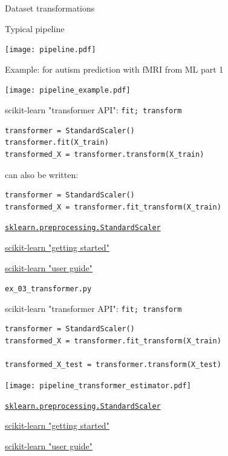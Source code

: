 \documentclass[presentation,mathserif,table]{beamer}
\begin{document}
\begin{frame}[label={sec:org1d89a0c}]{Dataset transformations}
\begin{block}{Typical pipeline}
\begin{center}
\texttt{[image: pipeline.pdf]}
\end{center}
\end{block}

\begin{block}{Example: for autism prediction with fMRI from ML part 1}
\begin{center}
\texttt{[image: pipeline\_example.pdf]}
\end{center}
\end{block}
\end{frame}
\begin{frame}[label={sec:org9d96564},fragile]{scikit-learn "transformer API": \texttt{fit; transform}}
 \begin{verbatim}
transformer = StandardScaler()
transformer.fit(X_train)
transformed_X = transformer.transform(X_train)
\end{verbatim}
\begin{block}{can also be written:}
\begin{verbatim}
transformer = StandardScaler()
transformed_X = transformer.fit_transform(X_train)
\end{verbatim}
\end{block}
\begin{structureenv} %
\vfill
\href{https://scikit-learn.org/stable/modules/generated/sklearn.preprocessing.StandardScaler.html\#sklearn.preprocessing.StandardScaler}{\texttt{sklearn.preprocessing.StandardScaler}}

\href{https://scikit-learn.org/stable/getting\_started.html\#transformers-and-pre-processors}{scikit-learn "getting started"}

\href{https://scikit-learn.org/stable/data\_transforms.html}{scikit-learn "user guide"}

\vfill
\texttt{ex\_03\_transformer.py}
\end{structureenv}
\end{frame}
\begin{frame}[label={sec:org821786f},fragile]{scikit-learn "transformer API": \texttt{fit; transform}}
 \begin{verbatim}
transformer = StandardScaler()
transformed_X = transformer.fit_transform(X_train)

transformed_X_test = transformer.transform(X_test)
\end{verbatim}
\vfill
\begin{center}
\texttt{[image: pipeline\_transformer\_estimator.pdf]}
\end{center}

\href{https://scikit-learn.org/stable/modules/generated/sklearn.preprocessing.StandardScaler.html\#sklearn.preprocessing.StandardScaler}{\texttt{sklearn.preprocessing.StandardScaler}}

\href{https://scikit-learn.org/stable/getting\_started.html\#transformers-and-pre-processors}{scikit-learn "getting started"}

\href{https://scikit-learn.org/stable/data\_transforms.html}{scikit-learn "user guide"}
\end{frame}
\end{document}

